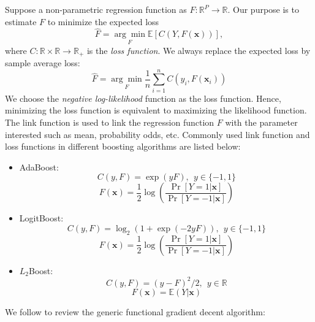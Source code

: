 \documentclass[11pt]{article}
\numberwithin{equation}{section}
\def\R{{\mathbb R}}  %
\def\E{{\mathbb E}}  %
\def\bx{\boldsymbol{x}}
\begin{document}
	Suppose a {non-parametric regression function} as $F:\R^P\rightarrow\R$. Our purpose is to  estimate $F$ to minimize the expected loss $$\hat{F}=\underset{F}{\arg\min}\E\left[C(Y,F(\bx))\right],$$
	where $C:\R\times\R\rightarrow\R_+$ is the \textit{loss function}.
	We always replace the expected loss by sample average loss:
	$$\hat{F}=\underset{F}{\arg\min} \frac{1}{n}\sum_{i=1}^nC(y_i,F(\bx_i))$$
	We choose the \textit{negative log-likelihood} function as the loss function. Hence, minimizing the loss function is equivalent to maximizing the likelihood function.
The link function is used to link the regression function $F$ with the parameter interested such as mean, probability odds, etc. 
	Commonly used {link function} and loss functions in different boosting algorithms are listed below:
	\begin{itemize}
		\item AdaBoost: $$C(y,F)=\exp(yF),  ~~ y\in\{-1,1\}$$
		$$F(\bx)=\frac{1}{2}\log\left(\frac{\Pr[Y=1|\bx]}{\Pr[Y=-1|\bx]}\right)$$
		\item LogitBoost: $$C(y,F)=\log_2(1+\exp(-2yF)), ~~ y\in\{-1,1\}$$
		$$F(\bx)=\frac{1}{2}\log\left(\frac{\Pr[Y=1|\bx]}{\Pr[Y=-1|\bx]}\right)$$
		\item $L_2$Boost: 
		\begin{equation}\label{l2}
			C(y,F)=(y-F)^2/2, ~~ y\in \R
		\end{equation}
		$$F(\bx)=\E(Y|\bx)$$
	\end{itemize}

We follow \citet{buehlmann:2003} to review the generic functional gradient decent algorithm:
\end{document}
